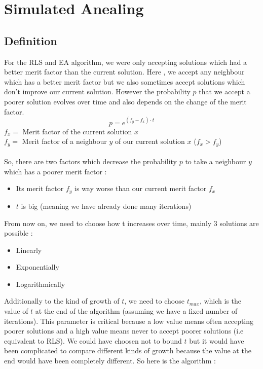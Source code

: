 \documentclass[a4paper,11pt,openany]{article}
\begin{document}
\section{Simulated Anealing}
\subsection{Definition}
\noindent
For the RLS and EA algorithm, we were only accepting solutions which had a better merit factor than the current solution. Here \cite{sa}, we accept any neighbour which has a better merit factor but we also sometimes accept solutions which don't improve our current solution. However the probability $p$ that we accept a poorer solution evolves over time and also depends on the change of the merit factor.
\begin{equation}
p=e^{(f_y-f_x)\cdot t}
\end{equation}
$f_x=$ Merit factor of the current solution $x$\\
$f_y=$ Merit factor of a neighbour $y$ of our current solution $x$ ($f_x>f_y$)\\\\
So, there are two factors which decrease the probability $p$ to take a neighbour $y$ which has a poorer merit factor :
\begin{itemize}
\item Its merit factor $f_y$ is way worse than our current merit factor $f_x$
\item $t$ is big (meaning we have already done many iterations)
\end{itemize} 
From now on, we need to choose how t increases over time, mainly 3 solutions are possible :
\begin{itemize}
\item Linearly
\item Exponentially
\item Logarithmically
\end{itemize}
Additionally to the kind of growth of $t$, we need to choose $t_{max}$, which is the value of $t$ at the end of the algorithm (assuming we have a fixed number of iterations). This parameter is critical because a low value means often accepting poorer solutions and a high value means never  to accept poorer solutions (i.e equivalent to RLS). We could have choosen not to bound $t$ but it would have been complicated to compare different kinds of growth because the value at the end would have been completely different. So here is the algorithm :
\end{document}
